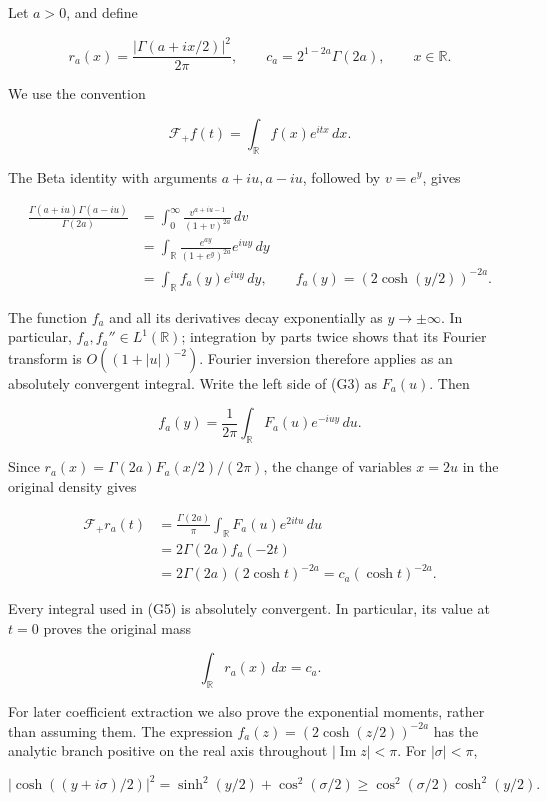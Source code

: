 Let \(a>0\), and define

\[
r_a(x)=\frac{|\Gamma(a+ix/2)|^2}{2\pi},\qquad
c_a=2^{1-2a}\Gamma(2a),\qquad x\in\mathbb{R}.
\tag{G1}
\]

We use the convention

\[
\mathcal F_+ f(t)=\int_{\mathbb{R}} f(x)e^{itx}\,dx.
\tag{G2}
\]

The Beta identity with arguments \(a+iu,a-iu\), followed by \(v=e^y\), gives

\[
\begin{aligned}
\frac{\Gamma(a+iu)\Gamma(a-iu)}{\Gamma(2a)}
&=\int_0^\infty\frac{v^{a+iu-1}}{(1+v)^{2a}}\,dv\\
&=\int_{\mathbb{R}}\frac{e^{ay}}{(1+e^y)^{2a}}e^{iuy}\,dy\\
&=\int_{\mathbb{R}} f_a(y)e^{iuy}\,dy,
\qquad f_a(y)=(2\cosh(y/2))^{-2a}.
\end{aligned}
\tag{G3}
\]

The function \(f_a\) and all its derivatives decay exponentially as \(y\to\pm\infty\). In particular, \(f_a,f_a''\in L^1(\mathbb{R})\); integration by parts twice shows that its Fourier transform is \(O((1+|u|)^{-2})\). Fourier inversion therefore applies as an absolutely convergent integral. Write the left side of (G3) as \(F_a(u)\). Then

\[
f_a(y)=\frac1{2\pi}\int_{\mathbb{R}}F_a(u)e^{-iuy}\,du.
\tag{G4}
\]

Since \(r_a(x)=\Gamma(2a)F_a(x/2)/(2\pi)\), the change of variables \(x=2u\) in the original density gives

\[
\begin{aligned}
\mathcal F_+r_a(t)
&=\frac{\Gamma(2a)}{\pi}\int_{\mathbb{R}}F_a(u)e^{2itu}\,du\\
&=2\Gamma(2a)f_a(-2t)\\
&=2\Gamma(2a)(2\cosh t)^{-2a}
=c_a(\cosh t)^{-2a}.
\end{aligned}
\tag{G5}
\]

Every integral used in (G5) is absolutely convergent. In particular, its value at \(t=0\) proves the original mass

\[
\int_{\mathbb{R}}r_a(x)\,dx=c_a.
\tag{G6}
\]

For later coefficient extraction we also prove the exponential moments, rather than assuming them. The expression \(f_a(z)=(2\cosh(z/2))^{-2a}\) has the analytic branch positive on the real axis throughout \(|\operatorname{Im}z|<\pi\). For \(|\sigma|<\pi\),

\[
|\cosh((y+i\sigma)/2)|^2
=\sinh^2(y/2)+\cos^2(\sigma/2)
\ge\cos^2(\sigma/2)\cosh^2(y/2).
\tag{G7}
\]

